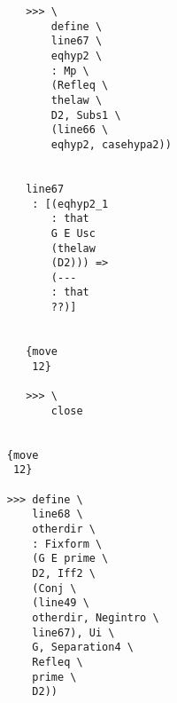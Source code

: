\documentclass[12pt]{article}
\begin{document}
\begin{verbatim}
                                       >>> \
                                           define \
                                           line67 \
                                           eqhyp2 \
                                           : Mp \
                                           (Refleq \
                                           thelaw \
                                           D2, Subs1 \
                                           (line66 \
                                           eqhyp2, casehypa2))


                                       line67 
                                        : [(eqhyp2_1 
                                           : that 
                                           G E Usc 
                                           (thelaw 
                                           (D2))) => 
                                           (--- 
                                           : that 
                                           ??)]


                                       {move 
                                        12}

                                       >>> \
                                           close


                                    {move 
                                     12}

                                    >>> define \
                                        line68 \
                                        otherdir \
                                        : Fixform \
                                        (G E prime \
                                        D2, Iff2 \
                                        (Conj \
                                        (line49 \
                                        otherdir, Negintro \
                                        line67), Ui \
                                        G, Separation4 \
                                        Refleq \
                                        prime \
                                        D2))



\end{verbatim}
\end{document}
